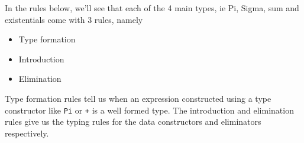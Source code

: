 \documentclass{article}
\begin{document}

In the rules below, we'll see that each of the 4 main types, ie Pi, Sigma, sum
and existentials come with 3 rules, namely
\begin{itemize}[label=$\ast$]
  \item Type formation
  \item Introduction
  \item Elimination
\end{itemize}

Type formation rules tell us when an expression constructed using a type
constructor like \texttt{Pi} or \texttt{+} is a well formed type.
The introduction and elimination rules give us the typing rules for the data
constructors and eliminators respectively.
\end{document}
